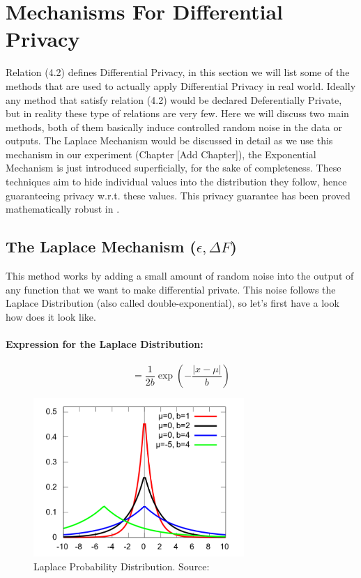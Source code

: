 \documentclass[12pt]{report}
\theoremstyle{named}
\begin{document}
\section{Mechanisms For Differential Privacy}
Relation (4.2) defines Differential Privacy, in this section we will list some of the methods that are used to actually apply Differential Privacy in real world. Ideally any method that satisfy relation (4.2) would be declared Deferentially Private, but in reality these type of relations are very few. Here we will discuss two main methods, both of them basically induce controlled random noise in the data or outputs. The Laplace Mechanism would be discussed in detail as we use this mechanism in our experiment (Chapter [Add Chapter]), the Exponential Mechanism is just introduced superficially, for the sake of completeness.  These techniques aim to hide individual values into the distribution they follow, hence guaranteeing privacy w.r.t. these values. This privacy guarantee has been proved mathematically robust in \cite{dwork2014algorithmic}.

\subsection{The Laplace Mechanism ($\epsilon, \Delta F$)}
\label{sec:LaplaceMecha}
This method works by adding a small amount of random noise into the output of any function that we want to make differential private. This noise follows the Laplace Distribution (also called double-exponential), so let's first have a look how does it look like.

\paragraph{Expression for the Laplace Distribution:\\}
\begin{equation}
=\frac{1}{2b} \exp(-\frac{\left | x-\mu  \right |}{b})
\end{equation}
\begin{figure}[ht]
\centering
        \includegraphics[width=80mm,scale=1]{Images/LaplaceDistribution.png}
    \caption{Laplace Probability Distribution. Source:\cite{LaplaceDist}}
    \label{fig:laplace}
\end{figure}
\end{document}
